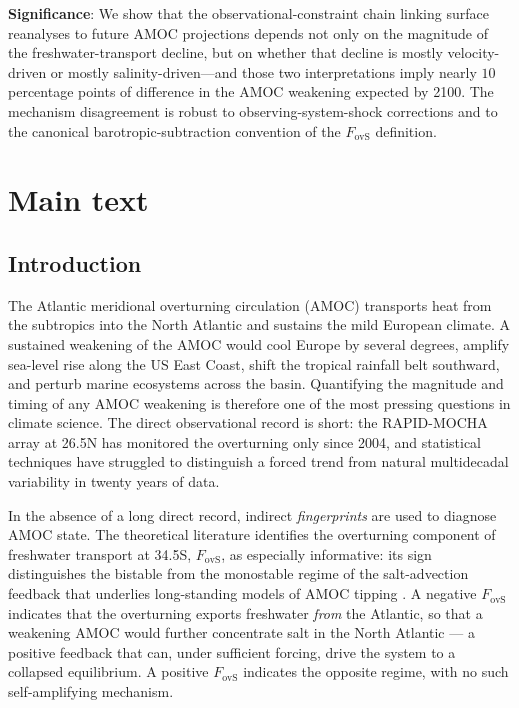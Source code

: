 \documentclass[12pt,a4paper]{article}
\newcommand{\Fovs}{F_\mathrm{ovS}}
\begin{document}
\textbf{Significance}: We show that the observational-constraint chain
linking surface reanalyses to future AMOC projections depends not only
on the magnitude of the freshwater-transport decline, but on whether
that decline is mostly velocity-driven or mostly salinity-driven---and
those two interpretations imply nearly $10$ percentage points of
difference in the AMOC weakening expected by 2100. The mechanism
disagreement is robust to observing-system-shock corrections and to
the canonical barotropic-subtraction convention of the $\Fovs$
definition.

\section*{Main text}

\subsection*{Introduction}
The Atlantic meridional overturning circulation (AMOC) transports heat
from the subtropics into the North Atlantic and sustains the mild
European climate. A sustained weakening of the AMOC would cool Europe
by several degrees, amplify sea-level rise along the US East Coast,
shift the tropical rainfall belt southward, and perturb marine
ecosystems across the basin. Quantifying the magnitude and timing of
any AMOC weakening is therefore one of the most pressing questions in
climate science. The direct observational record is short: the
RAPID-MOCHA array at 26.5\textdegree N has monitored the overturning
only since 2004, and statistical techniques have struggled to
distinguish a forced trend from natural multidecadal variability in
twenty years of data.

In the absence of a long direct record, indirect \emph{fingerprints}
are used to diagnose AMOC state. The theoretical literature identifies
the overturning component of freshwater transport at
34.5\textdegree S, $\Fovs$, as especially informative: its sign
distinguishes the bistable from the monostable regime of the
salt-advection feedback that underlies long-standing models of
AMOC tipping \citep{Rahmstorf1996, deVriesWeber2005, Dijkstra2007,
vanWesten2024}. A negative $\Fovs$ indicates that the overturning
exports freshwater \emph{from} the Atlantic, so that a weakening AMOC
would further concentrate salt in the North Atlantic --- a positive
feedback that can, under sufficient forcing, drive the system to a
collapsed equilibrium. A positive $\Fovs$ indicates the opposite
regime, with no such self-amplifying mechanism.
\end{document}
